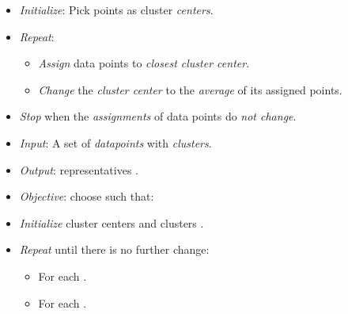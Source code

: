 \documentclass[
	number={6},
	title={Clustering}
]{cs584notes}
\begin{document}
\begin{itemize}
	\item \emph{Initialize}: Pick  points as cluster \emph{centers}.
	\item \emph{Repeat}:
	\begin{itemize}
		\item \emph{Assign} data points to \emph{closest cluster center}.
		\item \emph{Change} the \emph{cluster center} to the \emph{average} of its assigned points.
	\end{itemize}
	\item \emph{Stop} when the \emph{assignments} of data points do \emph{not change}.
	\item \emph{Input}: A set of  \emph{datapoints}  with  \emph{clusters}.
	\item \emph{Output}:  representatives .
	\item \emph{Objective}: choose  such that:
	\item \emph{Initialize} cluster centers  and clusters .
	\item \emph{Repeat} until there is no further change:
	\begin{itemize}
		\item For each .
		\item For each .
	\end{itemize}
\end{itemize}
\end{document}
